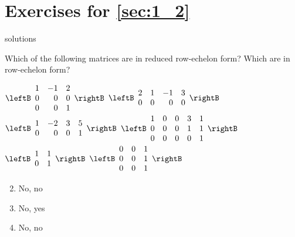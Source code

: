 
\section*{Exercises for \ref{sec:1_2}}

\begin{Filesave}{solutions}
\end{Filesave}

\begin{multicols}{2}
\begin{ex}
	\label{ex:1_2_1}
Which of the following matrices are in reduced row-echelon form? Which are in row-echelon form?

\begin{exenumerate}
\exitem 
$\leftB \begin{array}{rrr}
	1 & -1 & 2 \\
	0 &  0 & 0 \\
	0 &  0 & 1		
\end{array} \rightB$
\exitem 
$\leftB \begin{array}{rrrr}
	2 & 1 & -1 & 3 \\
	0 & 0 &  0 & 0
\end{array} \rightB$
\exitem 
$\leftB \begin{array}{rrrr}
1 & -2 & 3 & 5 \\
0 & 0 &  0 & 1
\end{array} \rightB$
\exitem 
$\leftB \begin{array}{rrrrr}
	1 & 0 & 0 & 3 & 1\\
	0 & 0 & 0 & 1 & 1 \\
	0 & 0 & 0 & 0 & 1
\end{array} \rightB$
\exitem
$\leftB \begin{array}{rr}
	1 & 1 \\
	0 & 1		
\end{array} \rightB$
\exitem 
$\leftB \begin{array}{rrr}
	0 &  0 & 1 \\
	0 &  0 & 1 \\
	0 &  0 & 1		
\end{array} \rightB$
\end{exenumerate}

\begin{sol}
\begin{enumerate}[label={\alph*.}]
\setcounter{enumi}{1}
\item  No, no
\setcounter{enumi}{3}
\item  No, yes
\setcounter{enumi}{5}
\item  No, no
\end{enumerate}
\end{sol}
\end{ex}


\end{multicols}
